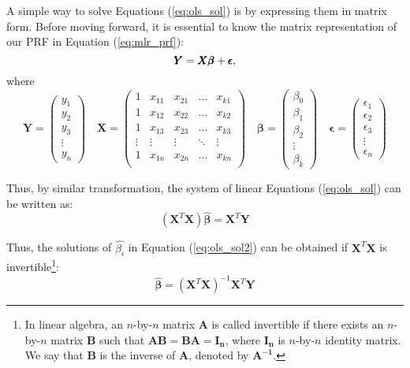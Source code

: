 A simple way to solve Equations (\ref{eq:ols_sol}) is by expressing them in matrix form. Before moving forward, it is essential to know the matrix representation of our \acs{PRF} in Equation (\ref{eq:mlr_prf}):
\begin{equation}\label{eq:ols_mat}
\pmb{Y} = \pmb{X}\pmb{\beta}+\pmb{\epsilon},
\end{equation}
where
\[
\pmb{Y}=\begin{pmatrix}
y_{1}\\y_{2}\\y_{3}\\\vdots\\y_{n}
\end{pmatrix}
\quad
\pmb{X}=\begin{pmatrix}
1 & x_{11} & x_{21} & \dots & x_{k1}\\
1 & x_{12} & x_{22} & \dots & x_{k2}\\
1 & x_{13} & x_{23} & \dots & x_{k3}\\
\vdots & \vdots & \vdots & \ddots & \vdots\\
1 & x_{1n} & x_{2n} & \dots & x_{kn}\\
\end{pmatrix}
\quad
\pmb{\beta}=\begin{pmatrix}
\beta_{0}\\\beta_{1}\\\beta_{2}\\\vdots\\\beta_{k}
\end{pmatrix}
\quad
\pmb{\epsilon}=\begin{pmatrix}
\epsilon_{1}\\\epsilon_{2}\\\epsilon_{3}\\\vdots\\\epsilon_{n}
\end{pmatrix}
\]


Thus, by similar transformation, the system of linear Equations (\ref{eq:ols_sol}) can be written as:
\begin{equation}\label{eq:ols_sol2}
(\pmb{X}^T\pmb{X})\pmb{\hat{\beta}}=\pmb{X}^T\pmb{Y}
\end{equation}

Thus, the solutions of ${\hat{\beta_{i}}}$ in Equation (\ref{eq:ols_sol2}) can be obtained if $\pmb{X}^T\pmb{X}$ is invertible\footnote{In linear algebra, an $n$-by-$n$ matrix $\pmb{A}$ is called invertible if there exists an $n$-by-$n$ matrix $\pmb{B}$ such that $\pmb{AB}=\pmb{BA}=\pmb{I_{n}}$, where $\pmb{I_{n}}$ is $n$-by-$n$ identity matrix. We say that $\pmb{B}$ is the inverse of $\pmb{A}$, denoted by $\pmb{A^{-1}}$.}:
\begin{equation}\label{eq:ols_sol3}
\pmb{\hat{\beta}}=(\pmb{X}^T\pmb{X})^{-1}\pmb{X}^T\pmb{Y}
\end{equation}

